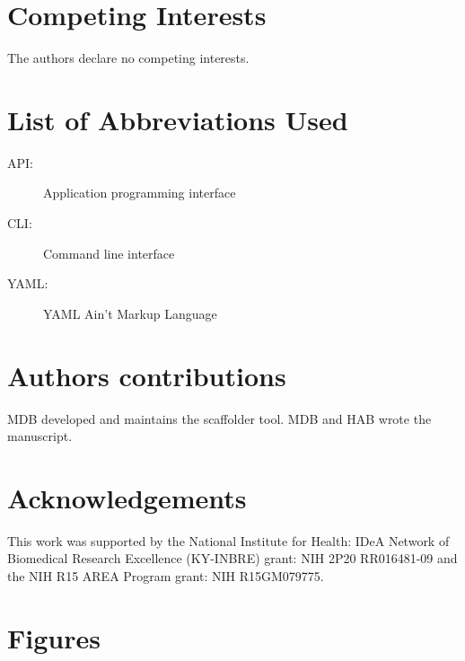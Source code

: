 \documentclass[10pt]{bmc_article}
\newenvironment{bmcformat}{\begin{raggedright}\baselineskip20pt\sloppy\setboolean{publ}{false}}{\end{raggedright}\baselineskip20pt\sloppy}
\begin{document}
\begin{bmcformat}
\clearpage

\section*{Competing Interests} %

The authors declare no competing interests.

\section*{List of Abbreviations Used} %

  \begin{description}
    \item[API:] Application programming interface
    \item[CLI:] Command line interface
    \item[YAML:] YAML Ain't Markup Language\cite{yaml}
  \end{description}

\section*{Authors contributions} %

MDB developed and maintains the scaffolder tool. MDB and HAB wrote the
manuscript.

\section*{Acknowledgements} %

This work was supported by the National Institute for Health: IDeA Network of
Biomedical Research Excellence (KY-INBRE) grant: NIH 2P20 RR016481-09 and the
NIH R15 AREA Program grant: NIH R15GM079775.

\clearpage

{
   }     %


\clearpage

\section*{Figures} %


\end{bmcformat}
\end{document}

